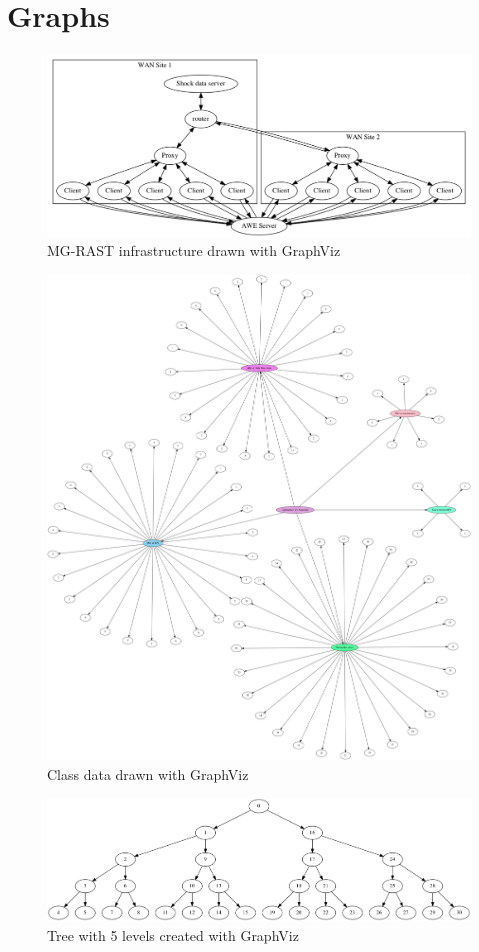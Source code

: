 \documentclass[11pt]{article}
\numberwithin{figure}{section}
\begin{document}
\section{Graphs}
\begin{figure}[ht]
	\centering
		\includegraphics[width=6in]{awesim.png}
	\caption{MG-RAST infrastructure drawn with GraphViz}
	\label{fig:awesim}
\end{figure}
\begin{figure}[ht]
	\centering
		\includegraphics[width=6in]{class.png}
	\caption{Class data drawn with GraphViz}
	\label{fig:class}
\end{figure}
\begin{figure}[ht]
	\centering
		\includegraphics[width=6in]{tree.png}
	\caption{Tree with 5 levels created with GraphViz}
	\label{fig:tree}
\end{figure}
\end{document}

